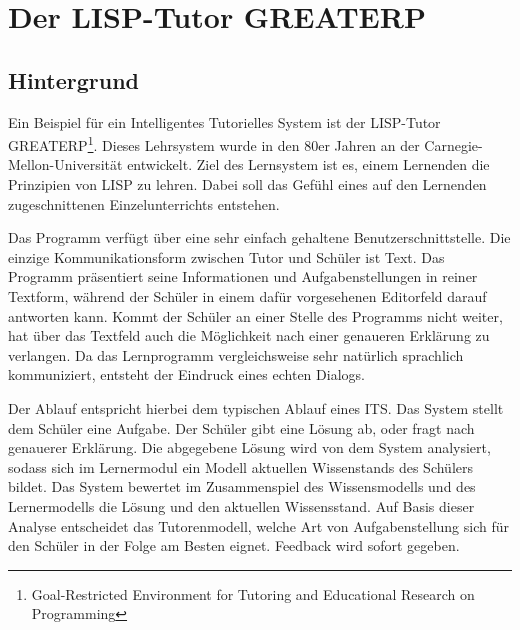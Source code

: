 \chapter{Der LISP-Tutor GREATERP}

\section{Hintergrund}

Ein Beispiel für ein Intelligentes Tutorielles System ist der LISP-Tutor GREATERP\footnote{Goal-Restricted Environment for Tutoring and Educational Research on Programming}.
Dieses Lehrsystem wurde in den 80er Jahren an der Carnegie-Mellon-Universität entwickelt.
Ziel des Lernsystem ist es, einem Lernenden die Prinzipien von LISP zu lehren. Dabei soll das
Gefühl eines auf den Lernenden zugeschnittenen Einzelunterrichts entstehen.

Das Programm verfügt über eine sehr einfach gehaltene Benutzerschnittstelle.
Die einzige Kommunikationsform zwischen Tutor und Schüler ist Text.
Das Programm präsentiert seine Informationen und Aufgabenstellungen in reiner Textform,
während der Schüler in einem dafür vorgesehenen Editorfeld darauf antworten kann.
Kommt der Schüler an einer Stelle des Programms nicht weiter, hat über das Textfeld auch die Möglichkeit
nach einer genaueren Erklärung zu verlangen.
Da das Lernprogramm vergleichsweise sehr natürlich sprachlich kommuniziert, entsteht der
Eindruck eines echten Dialogs.

Der Ablauf entspricht hierbei dem typischen Ablauf eines ITS.
Das System stellt dem Schüler eine Aufgabe. Der Schüler gibt eine Lösung ab, oder fragt nach genauerer Erklärung.
Die abgegebene Lösung wird von dem System analysiert, sodass sich im Lernermodul ein Modell aktuellen Wissenstands des Schülers bildet.
Das System bewertet im Zusammenspiel des Wissensmodells und des Lernermodells die Lösung und den aktuellen Wissensstand.
Auf Basis dieser Analyse entscheidet das Tutorenmodell, welche Art von Aufgabenstellung sich für den Schüler in der Folge am Besten eignet.
Feedback wird sofort gegeben.

